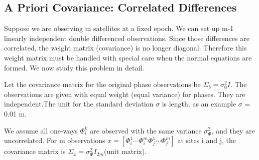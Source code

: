 \subsection{A Priori Covariance: Correlated Differences}

Suppose we are observing m satellites at a fixed epoch. We can set up m-1 linearly independent double differenced observations. Since those differences are correlated, the weight matrix (covariance) is no longer diagonal. Therefore this weight matrix must be handled with special care when the normal equations are formed. We now study this problem in detail.

Let the covariance matrix for the original phase observations be $\Sigma_{b}=\sigma_{0}^{2}I$. The observations are given with equal weight (equal variance) for phases. They are independent.The unit for the standard deviation $\sigma$ is length; as an example $\sigma$ = 0.01 m.

We assume all one-ways $\Phi_{i}^{k}$ are observed with the same variance $\sigma_{\Phi}^{2}$, and they are uncorrelated. For m observations $x=[\Phi_{i}^{1} \cdots \Phi_{i}^{m} \Phi_{j}^{1} \cdots \Phi_{j}^{m}]$ at sites i and j, the covariance matrix is $\Sigma_{x}=\sigma_{\Phi}^{2}I_{2m}$(unit matrix).

